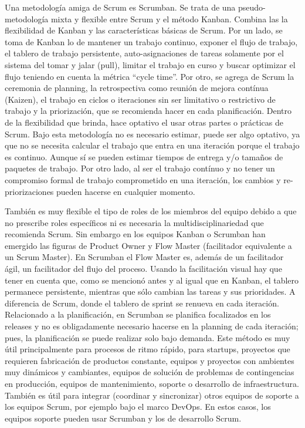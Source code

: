 Una metodología amiga de Scrum es Scrumban. Se trata de una pseudo-metodología mixta y flexible entre Scrum y el método Kanban. Combina las la flexibilidad de Kanban y las características básicas de Scrum. Por un lado, se toma de Kanban lo de mantener un trabajo continuo, exponer el flujo de trabajo, el tablero de trabajo persistente, auto-asignaciones de tareas solamente por el sistema del tomar y jalar (pull), limitar el trabajo en curso y buscar optimizar el flujo teniendo en cuenta la métrica “cycle time”. Por otro, se agrega de Scrum la ceremonia de planning, la retrospectiva como reunión de mejora contínua (Kaizen), el trabajo en ciclos o iteraciones sin ser limitativo o restrictivo de trabajo y la priorización, que se recomienda hacer en cada planificación. Dentro de la flexibilidad que brinda, hace optativo el usar otras partes o prácticas de Scrum. Bajo esta metodología no es necesario estimar, puede ser algo optativo, ya que no se necesita calcular el trabajo que entra en una iteración porque el trabajo es continuo. Aunque sí se pueden estimar tiempos de entrega y/o tamaños de paquetes de trabajo. Por otro lado, al ser el trabajo contínuo y no tener un compromiso formal de trabajo comprometido en una iteración, los cambios y re-priorizaciones pueden hacerse en cualquier momento. 
 
También es muy flexible el tipo de roles de los miembros del equipo debido a que no prescribe roles específicos ni es necesaria la multidisciplinariedad que recomienda Scrum. Sin embargo en los equipos Kanban o Scrumban han emergido las figuras de Product Owner y Flow Master (facilitador equivalente a un Scrum Master). En Scrumban el Flow Master es, además de un facilitador ágil, un facilitador del flujo del proceso. Usando la facilitación visual hay que tener en cuenta que, como se mencionó antes y al igual que en Kanban, el tablero permanece persistente, mientras que sólo cambian las tareas y sus prioridades. A diferencia de Scrum, donde el tablero de sprint se renueva en cada iteración. Relacionado a la planificación, en Scrumban se planifica focalizados en los releases y no es obligadamente necesario hacerse en la planning de cada iteración; pues, la planificación se puede realizar solo bajo demanda. Este método es muy útil principalmente para procesos de ritmo rápido, para startups, proyectos que requieren fabricación de productos constante, equipos y proyectos con ambientes muy dinámicos y cambiantes, equipos de solución de problemas de contingencias en producción, equipos de mantenimiento, soporte o desarrollo de infraestructura. También es útil para integrar (coordinar y sincronizar) otros equipos de soporte a los equipos Scrum, por ejemplo bajo el marco DevOps. En estos casos, los equipos soporte pueden usar Scrumban y los de desarrollo Scrum.

